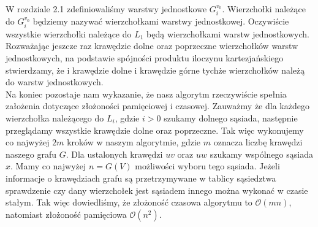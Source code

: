 \documentclass[12pt,a4paper,titlepage]{article}
\begin{document}
W rozdziale 2.1 zdefiniowaliśmy warstwy jednostkowe $G_i ^{v_0}$. Wierzchołki należące do $G_i ^{v_0}$ będziemy nazywać wierzchołkami warstwy jednostkowej. Oczywiście wszystkie wierzchołki należące do $L_1$ będą wierzchołkami warstw jednostkowych.\\
Rozważając jeszcze raz krawędzie dolne oraz poprzeczne wierzchołków warstw jednostkowych, na podstawie spójności produktu iloczynu kartezjańskiego stwierdzamy, że i krawędzie dolne i krawędzie górne tychże wierzchołków należą do warstw jednostkowych.
\\
Na koniec pozostaje nam wykazanie, że nasz algorytm rzeczywiście spełnia założenia dotyczące złożoności pamięciowej i czasowej. Zauważmy że dla każdego wierzchołka należącego do $L_i$, gdzie $i>0$ szukamy dolnego sąsiada, następnie przeglądamy wszystkie krawędzie dolne oraz poprzeczne. Tak więc wykonujemy co najwyżej $2m$ kroków w naszym algorytmie, gdzie $m$ oznacza liczbę krawędzi naszego grafu $G$. Dla ustalonych krawędzi $uv$ oraz $uw$ szukamy wspólnego sąsiada $x$. Mamy co najwyżej $n=G(V)$ możliwości wyboru tego sąsiada. Jeżeli informacje o krawędziach grafu są przetrzymywane w tablicy sąsiedztwa sprawdzenie czy dany wierzchołek jest sąsiadem innego można wykonać w czasie stałym. Tak więc dowiedliśmy, że złożoność czasowa algorytmu to $\mathcal{O}(mn)$, natomiast złożoność pamięciowa $\mathcal{O}(n^2)$.\\
\end{document}
